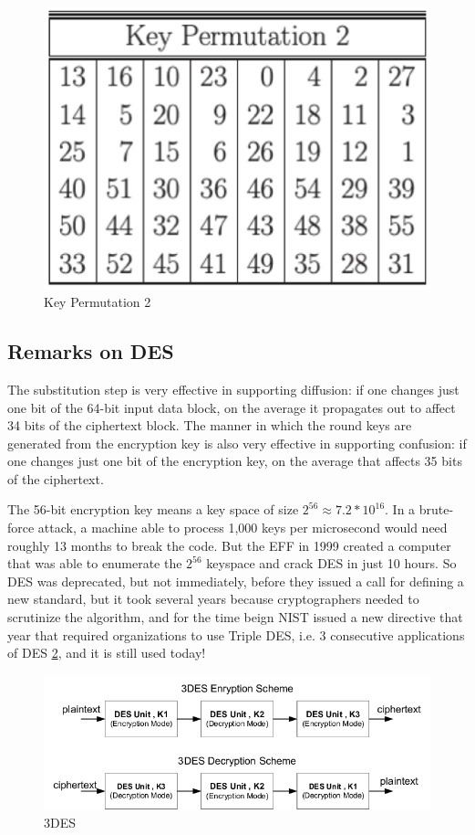 \begin{figure}
	\centering
	\includegraphics[width=0.3\linewidth]{Images/Chapter3/Key_Permutation_2}
	\caption{Key Permutation 2}
	\label{fig:Key_Permutation_2}
\end{figure}


\subsection{Remarks on DES}
The substitution step is very effective in supporting diffusion: if one changes just one bit of the 64-bit input data block, on the average it propagates out to affect 34 bits of the ciphertext block.
The manner in which the round keys are generated
from the encryption key is also very effective in supporting confusion: if one changes just one bit of the encryption key, on the average that affects 35 bits of the ciphertext.

The 56-bit encryption key means a key space of size $2^{56} \approx 7.2 * 10^{16}$. In a brute-force attack, a machine able to process 1,000 keys per microsecond would need roughly 13 months to break the code. But the EFF in 1999 created a computer that was able to enumerate the $2^{56}$ keyspace and crack DES in just 10 hours. So DES was deprecated, but not immediately, before they issued a call for defining a new standard, but it took several years because cryptographers needed to scrutinize the algorithm, and for the time beign NIST issued a new directive that year that required organizations to use Triple DES, i.e. 3 consecutive applications of DES \ref{fig:3DES}, and it is still used today!

\begin{figure}
	\centering
	\includegraphics[width=0.7\linewidth]{Images/Chapter3/3DES}
	\caption{3DES}
	\label{fig:3DES}
\end{figure}

